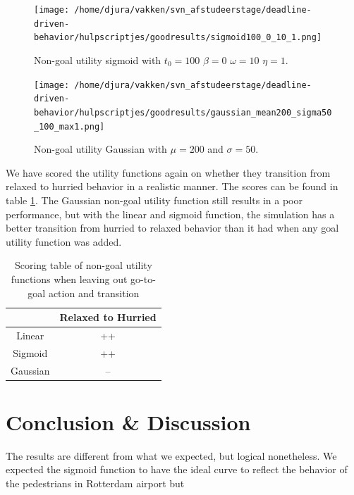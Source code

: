 \documentclass[11pt]{book}
\begin{document}
\begin{figure}
\centering
\texttt{[image: /home/djura/vakken/svn\_afstudeerstage/deadline-driven-behavior/hulpscriptjes/goodresults/sigmoid100\_0\_10\_1.png]}
\caption{Non-goal utility sigmoid with $t_0=100$ $\beta=0$ $\omega=10$ $\eta=1$.}
\label{fig:sigmoid100_0_10_1}
\end{figure}

\begin{figure}
\centering
\texttt{[image: /home/djura/vakken/svn\_afstudeerstage/deadline-driven-behavior/hulpscriptjes/goodresults/gaussian\_mean200\_sigma50\_100\_max1.png]}
\caption{Non-goal utility Gaussian with $\mu=200$ and $\sigma=50$.}
\label{fig:Gaussian_mean200_sigma50_100_max1}
\end{figure}

We have scored the utility functions again on whether they transition from relaxed to hurried behavior in a realistic manner. The scores can be found in table \ref{tab:secondquantitativetable}. The Gaussian non-goal utility function still results in a poor performance, but with the linear and sigmoid function, the simulation has a better transition from hurried to relaxed behavior than it had when any goal utility function was added.

\begin{table}
\begin{tabular}{|c|c|}
\hline 
 & Relaxed to Hurried\\ 
\hline 
Linear & ++  \\ 
\hline 
Sigmoid & ++  \\ 
\hline 
Gaussian & --\\
\hline
\end{tabular} 
\caption{Scoring table of non-goal utility functions when leaving out go-to-goal action and transition}
\label{tab:secondquantitativetable}
\end{table}

\chapter{Conclusion \& Discussion}
\label{chap:conclusiondiscusssion}
The results are different from what we expected, but logical nonetheless. We expected the sigmoid function to have the ideal curve to reflect the behavior of the pedestrians in Rotterdam airport but
\end{document}
